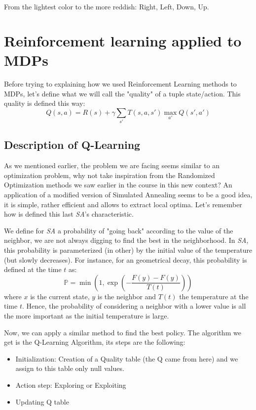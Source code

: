 \documentclass[11pt]{article}
\begin{document}
\begin{multicols}{2}
From the lightest color to the more reddish: Right, Left, Down, Up.

\section{Reinforcement learning applied to MDPs}

Before trying to explaining how we used Reinforcement Learning methods to MDPs, let's define what we will call the "quality" of a tuple state/action. This quality is defined this way: 
$$Q(s,a) = R(s) + \gamma \sum_{s'} T(s, a, s') \underset{a'}{\max} Q(s', a')$$

\subsection{Description of Q-Learning}

As we mentioned earlier, the problem we are facing seems similar to an optimization problem, why not take inspiration from the Randomized Optimization methods we saw earlier in the course in this new context?
An application of a modified version of Simulated Annealing seems to be a good idea, it is simple, rather efficient and allows to extract local optima. Let's remember how is defined this last \textit{SA}'s characteristic. 

We define for \textit{SA} a probability of "going back" according to the value of the neighbor, we are not always digging to find the best in the neighborhood. In \textit{SA}, this probability is parameterized (in other) by the initial value of the temperature (but slowly decreases). For instance, for an geometrical decay, this probability is defined at the time $t$ as:
$$ \mathbb{P} = \min \left(1, \exp (- \frac{F(y)-F(y)}{T(t)})\right)$$
where $x$ is the current state, $y$ is the neighbor and $T(t)$ the temperature at the time $t$. Hence, the probability of considering a neighbor with a lower value is all the more important as the initial temperature is large. 

Now, we can apply a similar method to find the best policy. The algorithm we get is the Q-Learning Algorithm, its steps are the following: 
\begin{itemize}
\item Initialization: Creation of a Quality table (the Q came from here) and we assign to this table only null values.
\item Action step: Exploring or Exploiting
\item Updating Q table
\end{itemize}


\end{multicols}
\end{document}
